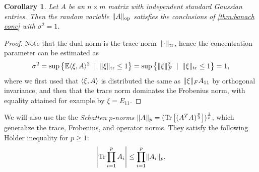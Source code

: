 \documentclass[aos]{imsart}
\newtheorem{corollary}[theorem]{Corollary}
\newtheorem{lemma}[theorem]{Lemma}
\theoremstyle{definition}
\numberwithin{equation}{section}
\DeclareMathOperator{\op}{op}
\DeclareMathOperator{\tr}{Tr}
\DeclarePairedDelimiter{\abs}{\lvert}{\rvert}
\DeclarePairedDelimiter{\norm}{\lVert}{\rVert}
\newcommand{\R}{{\mathbb{R}}}
\newcommand{\E}{\mathbb{E}}
\newcommand{\AR}[1]{{\color{orange}[AR: #1]}}
\newcommand{\MW}[1]{{\color{red}[MW: #1]}}
\newcommand{\AR}[1]{{}}
\newcommand{\MW}[1]{{}}
\begin{document}
\begin{appendix}
\begin{corollary}\label{lem:opNormSubG}
Let $A$ be an $n \times m$ matrix with independent standard Gaussian entries. Then the random variable $\norm{A}_{\op}$ satisfies the conclusions of \cref{thm:banach conc} with $\sigma^{2} = 1$.
\end{corollary}
\begin{proof}
Note that the dual norm is the trace norm~$\norm{\cdot}_{\operatorname{tr}}$, hence the concentration parameter can be estimated as
\begin{align*}
  \sigma^2
= \sup \left\{ \E \langle \xi, A \rangle^2 \;\mid\; \norm{\xi}_{\operatorname{tr}} \leq 1 \right\}
= \sup \left\{ \norm\xi_F^2 \;\mid\; \norm{\xi}_{\operatorname{tr}} \leq 1 \right\}
= 1,
\end{align*}
where we first used that $\braket{\xi,A}$ is distributed the same as $\norm\xi_F A_{11}$ by orthogonal invariance, and then that the trace norm dominates the Frobenius norm, with equality attained for example by $\xi = E_{11}$.
\end{proof}



We will also use the the \emph{Schatten $p$-norms} $\norm{A}_p = (\tr\left[(A^TA)^{\frac p2}\right])^{\frac1p}$, which generalize the trace, Frobenius, and operator norms.
They satisfy the following H\"older inequality for $p\geq1$:
\begin{align}\label{eq:holder}
  \abs*{\tr \prod_{i=1}^{p} A_i} \leq \prod_{i=1}^{p} \norm{A_i}_p,
\end{align}


\end{appendix}
\end{document}
